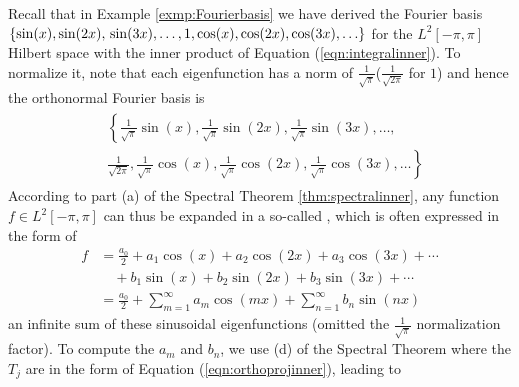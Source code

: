 Recall that in Example \ref{exmp:Fourierbasis} we have derived the Fourier basis $\{\sin(x), \sin(2x), \\ \sin(3x), \ldots, 1, \cos(x), \cos(2x), \cos(3x), \ldots\}$ for the $L^2[-\pi, \pi]$ Hilbert space with the inner product of Equation (\ref{eqn:integralinner}). To normalize it, note that each eigenfunction has a norm of $\frac{1}{\sqrt{\pi}}$\footnotemark ($\frac{1}{\sqrt{2\pi}}$ for $1$) and hence the orthonormal Fourier basis is 
\begin{align}
\begin{aligned}
&\left\{\frac{1}{\sqrt{\pi}}\sin(x), \frac{1}{\sqrt{\pi}}\sin(2x), \frac{1}{\sqrt{\pi}}\sin(3x), \ldots,\right. \\
&\left.\frac{1}{\sqrt{2\pi}}, \frac{1}{\sqrt{\pi}}\cos(x), \frac{1}{\sqrt{\pi}}\cos(2x), \frac{1}{\sqrt{\pi}}\cos(3x), \ldots\right\} 
\end{aligned}
\end{align} According to part (a) of the Spectral Theorem \ref{thm:spectralinner}, any function $f \in L^2[-\pi, \pi]$ can thus be expanded in a so-called , which is often expressed in the form of
\begin{subequations}
 \label{eqn:fourierseries}
\begin{align}
f &= \frac{a_0}{2} + a_1\cos(x) + a_2\cos(2x) + a_3\cos(3x) + \cdots \nonumber \\
& \quad + b_1\sin(x) + b_2\sin(2x) + b_3\sin(3x) + \cdots \\
&= \frac{a_0}{2} + \sum_{m=1}^{\infty} a_m \cos(mx) + \sum_{n=1}^{\infty} b_n \sin(nx) 
\end{align}
\end{subequations}
an infinite sum of these sinusoidal eigenfunctions (omitted the $\frac{1}{\sqrt{\pi}}$ normalization factor). To compute the  $a_m$ and $b_n$, we use (d) of the Spectral Theorem where the $T_j$ are in the form of Equation (\ref{eqn:orthoprojinner}), leading to
